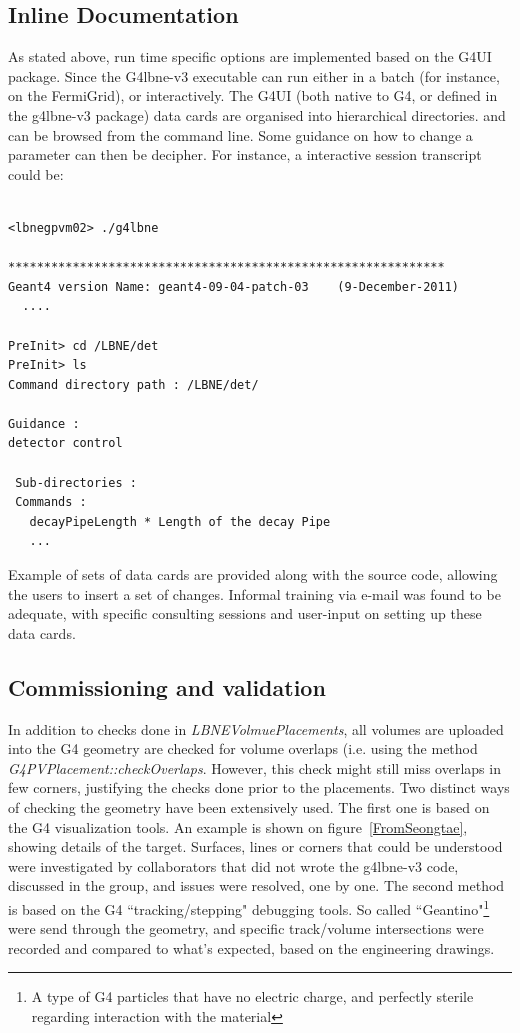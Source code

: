 \subsection{Inline Documentation}     As stated above, run time specific options are implemented based on the G4UI package. Since the G4lbne-v3 executable can run either in a batch (for instance,    on the FermiGrid), or interactively. The G4UI (both native to G4, or defined in the g4lbne-v3 package) data cards are organised into hierarchical directories.     and can be browsed from the command line. Some guidance on how to change a parameter can then be decipher.  For instance, a interactive session transcript    could be:    \begin{verbatim} 

<lbnegpvm02> ./g4lbne

************************************************************* 
Geant4 version Name: geant4-09-04-patch-03    (9-December-2011)
  ....  

PreInit> cd /LBNE/det
PreInit> ls
Command directory path : /LBNE/det/

Guidance :
detector control

 Sub-directories :
 Commands :  
   decayPipeLength * Length of the decay Pipe
   ...    

\end{verbatim}   Example of sets of data cards are provided along with the source code, allowing the users to insert a  set of changes. Informal training via e-mail was found to  be adequate, with specific consulting sessions and user-input on setting up these data cards.        

\subsection{Commissioning and validation}      In addition to checks done in {\em LBNEVolmuePlacements}, all volumes are uploaded into the G4 geometry are checked for volume overlaps (i.e. using the method {\em   G4PVPlacement::checkOverlaps}.  However, this check might still miss overlaps in few corners, justifying the checks done prior to the placements.      Two distinct ways of checking the geometry have been extensively used.  The first one is based on the G4 visualization tools. An example is shown on   figure~\ref{FromSeongtae}, showing details of the target.  Surfaces, lines or corners that could be understood were investigated by collaborators that did not   wrote the g4lbne-v3 code, discussed in the group, and issues were resolved, one by one. The second method is based on the G4 ``tracking/stepping" debugging   tools. So called ``Geantino"\footnote{A type of G4 particles that have no electric charge, and perfectly sterile regarding interaction with the material} were   send through the geometry, and specific track/volume intersections were recorded and compared to what's expected, based on the engineering drawings.  

